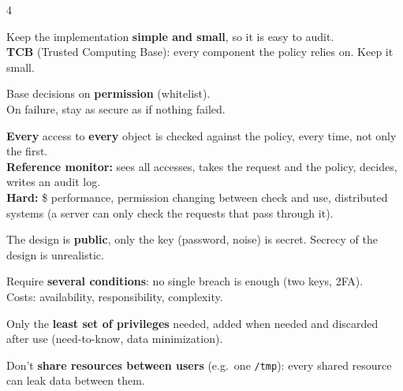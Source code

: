 \documentclass[8pt,a4paper,landscape]{extarticle}
\begin{document}
\begin{multicols*}{4}
\begin{defn}[title={1 - Economy of mechanism (KISS)}]
    Keep the implementation \textbf{simple and small}, so it is easy to audit.\\
    \textbf{TCB} (Trusted Computing Base): every component the policy relies on. Keep it small.
\end{defn}

\begin{defn}[title={2 - Fail-safe defaults}]
    Base decisions on \textbf{permission} (whitelist).\\
    On failure, stay as secure as if nothing failed.
\end{defn}

\begin{defn}[title={3 - Complete mediation}]
    \textbf{Every} access to \textbf{every} object is checked against the policy, every time, not only the first.\\
    \textbf{Reference monitor:} sees all accesses, takes the request and the policy, decides, writes an audit log.\\
    \textbf{Hard:} \$ performance, permission changing between check and use, distributed systems (a server can only check the requests that pass through it).
\end{defn}

\begin{defn}[title={4 - Open design}]
    The design is \textbf{public}, only the key (password, noise) is secret. Secrecy of the design is unrealistic.
\end{defn}

\begin{defn}[title={5 - Separation of privilege}]
    Require \textbf{several conditions}: no single breach is enough (two keys, 2FA).\\
    Costs: availability, responsibility, complexity.
\end{defn}

\begin{defn}[title={6 - Least privilege}]
    Only the \textbf{least set of privileges} needed, added when needed and discarded after use (need-to-know, data minimization).
\end{defn}

\begin{defn}[title={7 - Least common mechanism}]
    Don't \textbf{share resources between users} (e.g.\ one \texttt{/tmp}): every shared resource can leak data between them.\end{defn}


\end{multicols*}
\end{document}
